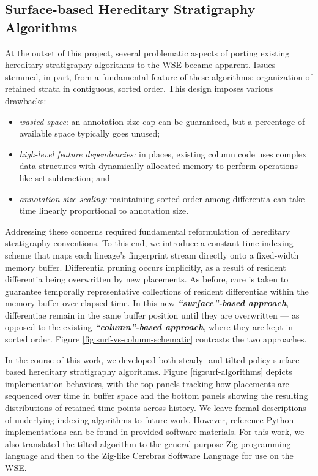 \subsection{Surface-based Hereditary Stratigraphy Algorithms}



At the outset of this project, several problematic aspects of porting existing hereditary stratigraphy algorithms to the WSE became apparent.
Issues stemmed, in part, from a fundamental feature of these algorithms: organization of retained strata in contiguous, sorted order.
This design imposes various drawbacks:
\begin{itemize}
\item \textit{wasted space}: an annotation size cap can be guaranteed, but a percentage of available space typically goes unused;
\item \textit{high-level feature dependencies:} in places, existing column code uses complex data structures with dynamically allocated memory to perform operations like set subtraction; and
\item \textit{annotation size scaling:} maintaining sorted order among differentia can take time linearly proportional to annotation size.
\end{itemize}

\noindent
Addressing these concerns required fundamental reformulation of hereditary stratigraphy conventions.
To this end, we introduce a constant-time indexing scheme that maps each lineage's fingerprint stream directly onto a fixed-width memory buffer.
Differentia pruning occurs implicitly, as a result of resident differentia being overwritten by new placements.
As before, care is taken to guarantee temporally representative collections of resident differentiae within the memory buffer over elapsed time.
In this new \textit{\textbf{``surface''-based approach}}, differentiae remain in the same buffer position until they are overwritten --- as opposed to the existing \textit{\textbf{``column''-based approach}}, where they are kept in sorted order.
Figure \ref{fig:surf-vs-column-schematic} contrasts the two approaches.

In the course of this work, we developed both steady- and tilted-policy surface-based hereditary stratigraphy algorithms.
Figure \ref{fig:surf-algorithms} depicts implementation behaviors, with the top panels tracking how placements are sequenced over time in buffer space and the bottom panels showing the resulting distributions of retained time points across history.
We leave formal descriptions of underlying indexing algorithms to future work.
However, reference Python implementations can be found in provided software materials.
For this work, we also translated the tilted algorithm to the general-purpose Zig programming language and then to the Zig-like Cerebras Software Language for use on the WSE.


